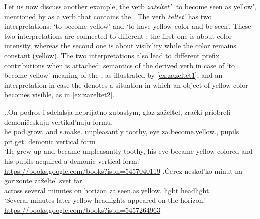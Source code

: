 Let us now discuss another example, the verb \textit{za\v{z}eltet'} `to become seen as yellow', mentioned by \citet{Braginsky:08} as a verb that contains the  {.} The verb \textit{\v{z}eltet'} has two interpretations: `to become yellow' and `to have yellow color and be seen'. These two interpretations are connected to different  : the first one is about color intensity, whereas the second one is about visibility while the color remains constant (yellow). The two interpretations also lead to different prefix contributions when  is attached:  semantics of the derived verb in case of `to become yellow' meaning of the , as illustrated by \ref{ex:zazeltet1}, and an  interpretation in case the  denotes a  situation in which an object of yellow color becomes visible, as in \ref{ex:zazeltet2}.


\ex.\label{ex:zazeltet}\ag.\label{ex:zazeltet1}On podros i sdelalsja neprijatno zubastym, glaz za\v{z}eltel, zra\v{c}ki priobreli demoni\v{c}eskuju vertikal'nuju formu.\\
he pod.grow. and s.make. unpleasantly toothy, eye za.become.yellow., pupils pri.get. demonic vertical form\\
`He grew up and became unpleasantly toothy, his eye became yellow-colored and his pupils acquired a demonic vertical form.'\\\hbox{}\hfill\hbox{\url{https://books.google.com/books?isbn=5457040119}}
\bg.\label{ex:zazeltet2}\v{C}erez neskol'ko minut na gorizonte za\v{z}eltel svet far.\\
across several minutes on horizon za.seen.as.yellow. light headlight.\\
`Several minutes later yellow headlights appeared on the horizon.'\\\hbox{}\hfill\hbox{\url{https://books.google.com/books?isbn=5457264963}}

